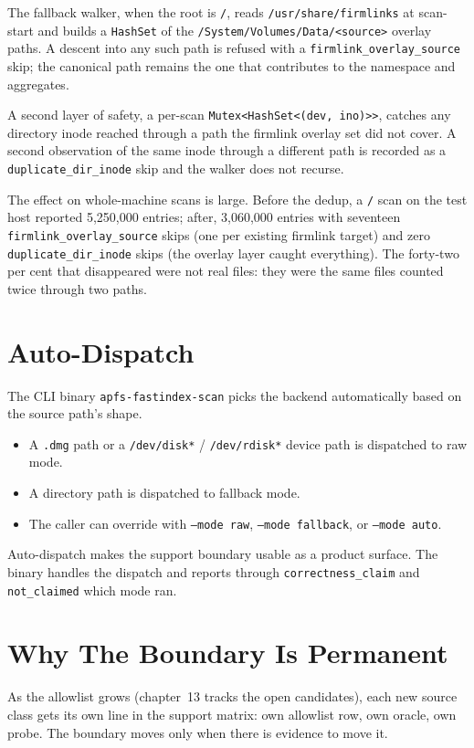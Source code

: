 The fallback walker, when the root is \texttt{/}, reads
\texttt{/usr/share/firmlinks} at scan-start and builds a
\texttt{HashSet} of the \texttt{/System/Volumes/Data/<source>}
overlay paths. A descent into any such path is refused with a
\texttt{firmlink\_overlay\_source} skip; the canonical path
remains the one that contributes to the namespace and aggregates.

A second layer of safety, a per-scan
\texttt{Mutex<HashSet<(dev, ino)>>}, catches any directory
inode reached through a path the firmlink overlay set did not
cover. A second observation of the same inode through a different
path is recorded as a \texttt{duplicate\_dir\_inode} skip and the
walker does not recurse.

The effect on whole-machine scans is large. Before the dedup, a
\texttt{/} scan on the test host reported 5,250,000 entries;
after, 3,060,000 entries with seventeen
\texttt{firmlink\_overlay\_source} skips (one per existing
firmlink target) and zero \texttt{duplicate\_dir\_inode} skips
(the overlay layer caught everything). The forty-two per cent
that disappeared were not real files: they were the same files
counted twice through two paths.

\section{Auto-Dispatch}

The CLI binary \texttt{apfs-fastindex-scan} picks the backend
automatically based on the source path's shape.

\begin{itemize}
  \item A \texttt{.dmg} path or a \texttt{/dev/disk*} /
    \texttt{/dev/rdisk*} device path is dispatched to raw mode.
  \item A directory path is dispatched to fallback mode.
  \item The caller can override with \texttt{--mode raw},
    \texttt{--mode fallback}, or \texttt{--mode auto}.
\end{itemize}

Auto-dispatch makes the support boundary usable as a product
surface. The binary handles the dispatch and reports through
\texttt{correctness\_claim} and \texttt{not\_claimed} which mode
ran.

\section{Why The Boundary Is Permanent}

As the allowlist grows (chapter~13 tracks the open candidates),
each new source class gets its own line in the support matrix:
own allowlist row, own oracle, own probe. The boundary moves only
when there is evidence to move it.
